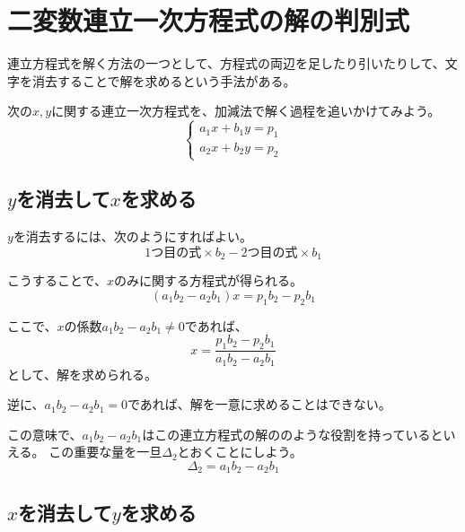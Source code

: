 \documentclass[../../../topic_linear-algebra]{subfiles}
\begin{document}
\sectionline
\section{二変数連立一次方程式の解の判別式}

連立方程式を解く方法の一つとして、方程式の両辺を足したり引いたりして、文字を消去することで解を求めるという手法がある。

\br

次の$x, y$に関する連立一次方程式を、加減法で解く過程を追いかけてみよう。
\begin{equation*}
  \begin{cases}
    a_1 x + b_1 y = p_1 \\
    a_2 x + b_2 y = p_2
  \end{cases}
\end{equation*}

\subsection{$y$を消去して$x$を求める}

$y$を消去するには、次のようにすればよい。
\begin{equation*}
  \text{1つ目の式} \times b_2 - \text{2つ目の式} \times b_1
\end{equation*}

こうすることで、$x$のみに関する方程式が得られる。
\begin{equation*}
  (a_1 b_2 - a_2 b_1) x = p_1 b_2 - p_2 b_1
\end{equation*}

ここで、$x$の係数$a_1 b_2 - a_2 b_1 \neq 0$であれば、
\begin{equation*}
  x = \frac{p_1 b_2 - p_2 b_1}{a_1 b_2 - a_2 b_1}
\end{equation*}
として、解を求められる。

\br

逆に、$a_1 b_2 - a_2 b_1 = 0$であれば、解を一意に求めることはできない。

\br

この意味で、$a_1 b_2 - a_2 b_1$はこの連立方程式の解ののような役割を持っているといえる。
この重要な量を一旦$\Delta_2$とおくことにしよう。
\begin{equation*}
  \Delta_2 = a_1 b_2 - a_2 b_1
\end{equation*}

\subsection{$x$を消去して$y$を求める}
\end{document}
